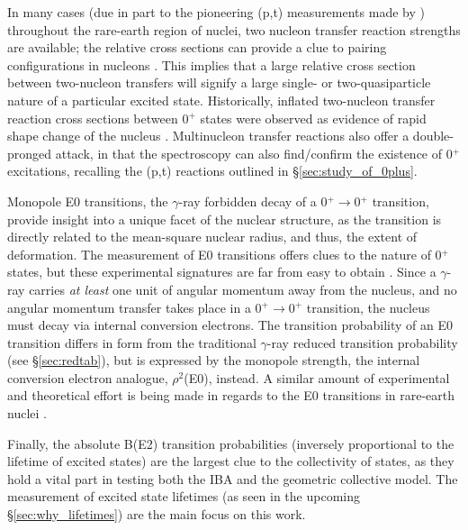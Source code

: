 In many cases (due in part to the pioneering (p,t) measurements made by \cite{Lesher_158Gdpt,Meyer_pt0_2006}) throughout the rare-earth region of nuclei, two nucleon transfer reaction strengths are available; the relative cross sections can provide a clue to pairing configurations in nucleons \cite{RevModPhys.83.1467}. This implies that a large relative cross section between two-nucleon transfers will signify a large single- or two-quasiparticle nature of a particular excited state. Historically, inflated two-nucleon transfer reaction cross sections between 0$^+$ states were observed as evidence of rapid shape change of the nucleus \cite{Clark_pairtransfer2009}. Multinucleon transfer reactions also offer a double-pronged attack, in that the spectroscopy can also find/confirm the existence of 0$^+$ excitations, recalling the (p,t) reactions outlined in \S \ref{sec:study_of_0plus}.

Monopole E0 transitions, the $\gamma$-ray forbidden decay of a 0$^+\rightarrow$0$^+$ transition, provide insight into a unique facet of the nuclear structure, as the transition is directly related to the mean-square nuclear radius, and thus, the extent of deformation. The measurement of E0 transitions offers clues to the nature of 0$^+$ states, but these experimental signatures are far from easy to obtain \cite{Heyde_text}. Since a $\gamma$-ray carries \textit{at least} one unit of angular momentum away from the nucleus, and no angular momentum transfer takes place in a 0$^+\rightarrow$0$^+$ transition, the nucleus must decay via internal conversion electrons. The transition probability of an E0 transition differs in form from the traditional $\gamma$-ray reduced transition probability (see \S \ref{sec:redtab}), but is expressed by the monopole strength, the internal conversion electron analogue, $\rho^2$(E0), instead. A similar amount of experimental and theoretical effort is being made in regards to the E0 transitions in rare-earth nuclei \cite{Ilie_E02011}. %

Finally, the absolute B(E2) transition probabilities (inversely proportional to the lifetime of excited states) are the largest clue to the collectivity of states, as they hold a vital part in testing both the IBA and the geometric collective model. The measurement of excited state lifetimes (as seen in the upcoming \S \ref{sec:why_lifetimes}) are the main focus on this work. 

